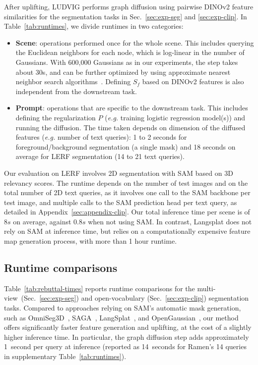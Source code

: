  After uplifting, LUDVIG performs graph diffusion using pairwise DINOv2 feature similarities for the segmentation tasks in Sec.~\ref{sec:exp-seg} and \ref{sec:exp-clip}. In Table~\ref{tab:runtimes}, we divide runtimes in two categories: 
\begin{itemize}
    \item \textbf{Scene}: operations performed once for the whole scene. This includes querying the Euclidean neighbors for each node, which is log-linear in the number of Gaussians. With 600,000 Gaussians as in our experiments, the step takes about 30s, and can be further optimized by using approximate nearest neighbor search algorithms~\citep{wang2021comprehensive}. Defining $S_f$ based on DINOv2 features is also independent from the downstream task.
    \item \textbf{Prompt}: operations that are specific to the downstream task. This includes defining the regularization $P$ (\emph{e.g.} training logistic regression model(s)) and running the diffusion. The time taken depends on dimension of the diffused features (\emph{e.g.} number of text queries): 1 to 2 seconds for foreground/background segmentation (a single mask) and 18 seconds on average for LERF segmentation (14 to 21 text queries).
\end{itemize}

 Our evaluation on LERF involves 2D segmentation with SAM based on 3D relevancy scores. The runtime depends on the number of test images and on the total number of 2D text queries, as it involves one call to the SAM backbone per test image, and multiple calls to the SAM prediction head per text query, as detailed in Appendix~\ref{sec:appendix-clip}. Our total inference time per scene is of $8 s$ on average, against $0.8 s$ when not using SAM. In contrast, Langsplat does not rely on SAM at inference time, but relies on a computationally expensive feature map generation process, with more than 1 hour runtime. 


\subsection{Runtime comparisons}
\label{sec:appendix-runtime-comp}

Table~\ref{tab:rebuttal-times} reports runtime comparisons for the multi-view~(Sec.~\ref{sec:exp-seg}) and open-vocabulary (Sec.~\ref{sec:exp-clip}) segmentation tasks.
%
Compared to approaches relying on SAM's automatic mask generation, such as OmniSeg3D~\citep{ying2023omniseg3d}, SAGA~\citep{cen2023saga}, LangSplat~\citep{qin2023langsplat}, and OpenGaussian~\citep{wu2024opengaussian}, our method offers significantly faster feature generation and uplifting, at the cost of a slightly higher inference time.
In particular, the graph diffusion step adds approximately 1~second per query at inference (reported as 14~seconds for Ramen’s 14 queries in supplementary Table~\ref{tab:runtimes}).

